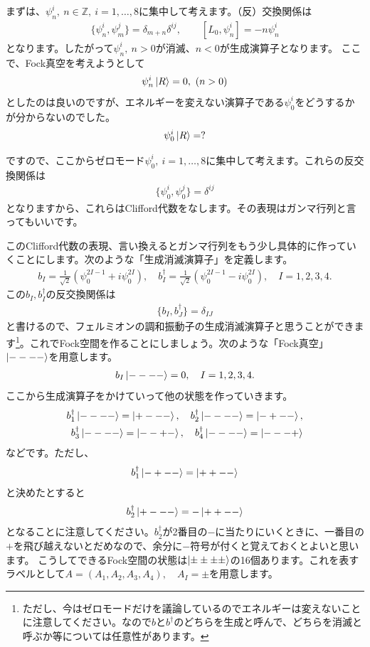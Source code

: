 \documentclass[report,paper=a4, fontsize=12pt, line_length=16cm, number_of_lines=34,dvipdfmx]{jlreq}
\numberwithin{equation}{chapter}
\numberwithin{equation}{section}
\newcommand{\Zb}{\mathbb{Z}}
\begin{document}
まずは、$\psi_{n}^{i},\ n\in \Zb,\ i=1,\dots,8$に集中して考えます。（反）交換関係は
\begin{align}
  \{\psi_{n}^{i},\psi_{m}^{j}\}=\delta_{m+n}\delta^{ij},\qquad
  [L_0,\psi^{i}_{n}]=-n\psi^{i}_{n}
\end{align}
となります。したがって$\psi^{i}_{n},\ n>0$が消滅、$n<0$が生成演算子となります。
ここで、Fock真空を考えようとして
\begin{align}
  \psi_{n}^{i}\ket{R}=0,\ (n>0)
\end{align}
としたのは良いのですが、エネルギーを変えない演算子である$\psi^{i}_{0}$をどうするかが分からないのでした。
\begin{align}
  \psi^{i}_{0}\ket{R}=?
\end{align}

ですので、ここからゼロモード$\psi^{i}_{0},\ i=1,\dots,8$に集中して考えます。これらの反交換関係は
\begin{align}
  \{\psi^{i}_{0},\psi^{j}_{0}\}=\delta^{ij}
\end{align}
となりますから、これらはClifford代数をなします。その表現はガンマ行列と言ってもいいです。

このClifford代数の表現、言い換えるとガンマ行列をもう少し具体的に作っていくことにします。次のような「生成消滅演算子」を定義します。
\begin{align}
  b_{I}=\frac{1}{\sqrt{2}}(\psi_{0}^{2I-1}+i\psi_{0}^{2I}),\quad
  b^{\dag}_{I}=\frac{1}{\sqrt{2}}(\psi_{0}^{2I-1}-i\psi_{0}^{2I})
  ,\quad I=1,2,3,4.
\end{align}
この$b_I,b^{\dag}_{I}$の反交換関係は
\begin{align}
  \{b_{I},b^{\dag}_{J}\}=\delta_{IJ}
\end{align}
と書けるので、フェルミオンの調和振動子の生成消滅演算子と思うことができます\footnote{ただし、今はゼロモードだけを議論しているのでエネルギーは変えないことに注意してください。なので$b$と$b^{\dag}$のどちらを生成と呼んで、どちらを消滅と呼ぶか等については任意性があります。}。これでFock空間を作ることにしましょう。次のような「Fock真空」$\ket{----}$を用意します。
\begin{align}
  b_{I}\ket{----}=0,\quad I=1,2,3,4.
\end{align}
ここから生成演算子をかけていって他の状態を作っていきます。
\begin{align}
  b^{\dag}_1\ket{----}=\ket{+---},\quad
  b^{\dag}_2\ket{----}=\ket{-+--},\nonumber\\
  b^{\dag}_3\ket{----}=\ket{--+-},\quad
  b^{\dag}_4\ket{----}=\ket{---+}
\end{align}
などです。ただし、
\begin{align}
  b^{\dag}_1\ket{-+--}=\ket{++--}
\end{align}
と決めたとすると
\begin{align}
  b^{\dag}_2\ket{+---}=-\ket{++--}
\end{align}
となることに注意してください。$b^{\dag}_{2}$が2番目の$-$に当たりにいくときに、一番目の$+$を飛び越えないとだめなので、余分に$-$符号が付くと覚えておくとよいと思います。
こうしてできるFock空間の状態は$\ket{\pm\pm\pm\pm}$の16個あります。これを表すラベルとして$A=(A_1,A_2,A_3,A_4),\quad A_{I}=\pm$を用意します。
\end{document}
